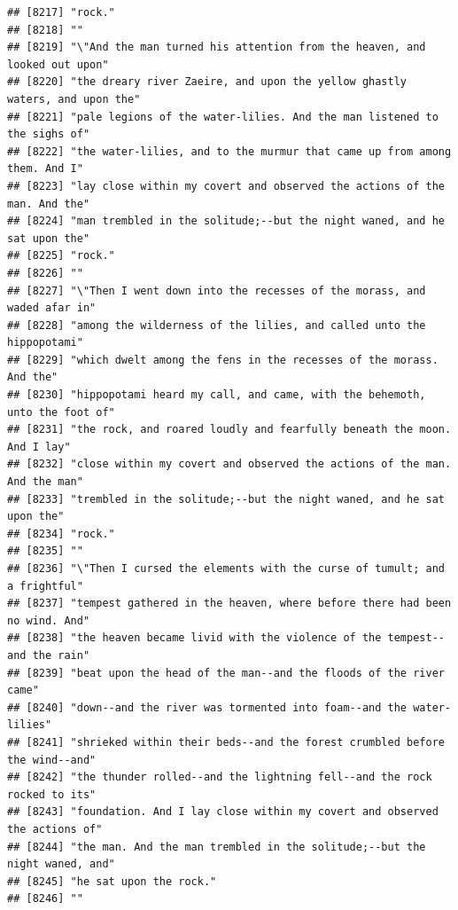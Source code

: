 \documentclass{article}\usepackage[]{graphicx}\usepackage[]{color}
\makeatletter
\newenvironment{kframe}{%
 \def\at@end@of@kframe{}%
 \ifinner\ifhmode%
  \def\at@end@of@kframe{\end{minipage}}%
  \begin{minipage}{\columnwidth}%
 \fi\fi%
 \def\FrameCommand##1{\hskip\@totalleftmargin \hskip-\fboxsep
 \colorbox{shadecolor}{##1}\hskip-\fboxsep
     \hskip-\linewidth \hskip-\@totalleftmargin \hskip\columnwidth}%
 \MakeFramed {\advance\hsize-\width
   \@totalleftmargin\z@ \linewidth\hsize
   \@setminipage}}%
 {\par\unskip\endMakeFramed%
 \at@end@of@kframe}
\newenvironment{knitrout}{}{} %
\makeatother
\begin{document}
\begin{knitrout}
\begin{kframe}
\begin{verbatim}
## [8217] "rock."                                                                       
## [8218] ""                                                                            
## [8219] "\"And the man turned his attention from the heaven, and looked out upon"     
## [8220] "the dreary river Zaeire, and upon the yellow ghastly waters, and upon the"   
## [8221] "pale legions of the water-lilies. And the man listened to the sighs of"      
## [8222] "the water-lilies, and to the murmur that came up from among them. And I"     
## [8223] "lay close within my covert and observed the actions of the man. And the"     
## [8224] "man trembled in the solitude;--but the night waned, and he sat upon the"     
## [8225] "rock."                                                                       
## [8226] ""                                                                            
## [8227] "\"Then I went down into the recesses of the morass, and waded afar in"       
## [8228] "among the wilderness of the lilies, and called unto the hippopotami"         
## [8229] "which dwelt among the fens in the recesses of the morass. And the"           
## [8230] "hippopotami heard my call, and came, with the behemoth, unto the foot of"    
## [8231] "the rock, and roared loudly and fearfully beneath the moon. And I lay"       
## [8232] "close within my covert and observed the actions of the man. And the man"     
## [8233] "trembled in the solitude;--but the night waned, and he sat upon the"         
## [8234] "rock."                                                                       
## [8235] ""                                                                            
## [8236] "\"Then I cursed the elements with the curse of tumult; and a frightful"      
## [8237] "tempest gathered in the heaven, where before there had been no wind. And"    
## [8238] "the heaven became livid with the violence of the tempest--and the rain"      
## [8239] "beat upon the head of the man--and the floods of the river came"             
## [8240] "down--and the river was tormented into foam--and the water-lilies"           
## [8241] "shrieked within their beds--and the forest crumbled before the wind--and"    
## [8242] "the thunder rolled--and the lightning fell--and the rock rocked to its"      
## [8243] "foundation. And I lay close within my covert and observed the actions of"    
## [8244] "the man. And the man trembled in the solitude;--but the night waned, and"    
## [8245] "he sat upon the rock."                                                       
## [8246] ""                                                                            

\end{verbatim}
\end{kframe}
\end{knitrout}
\end{document}
